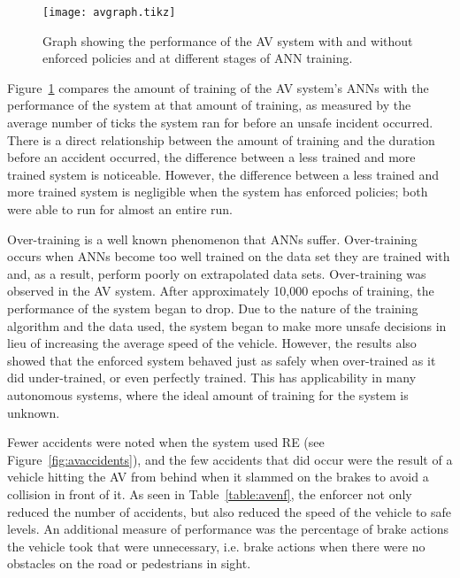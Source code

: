 \begin{figure}[h]
	\centering
	\texttt{[image: avgraph.tikz]}
	\caption{Graph showing the performance of the AV system with and without enforced policies and at different stages of \ac{ANN} training. \label{fig:avtrained}}
\end{figure}

Figure~\ref{fig:avtrained} compares the amount of training of the \ac{AV} system's \acp{ANN} with the performance of the system at that amount of training, as measured by the average number of ticks the system ran for before an unsafe incident occurred.
There is a direct relationship between the amount of training and the duration before an accident occurred, the difference between a less trained and more trained system is noticeable.
However, the difference between a less trained and more trained system is negligible when the system has enforced policies; both were able to run for almost an entire run. 

Over-training is a well known phenomenon that \acp{ANN} suffer. 
Over-training occurs when \acp{ANN} become too well trained on the data set they are trained with and, as a result, perform poorly on extrapolated data sets. 
Over-training was observed in the \ac{AV} system.
After approximately 10,000 epochs of training, the performance of the system began to drop. 
Due to the nature of the training algorithm and the data used, the system began to make more unsafe decisions in lieu of increasing the average speed of the vehicle.
However, the results also showed that the enforced system behaved just as safely when over-trained as it did under-trained, or even perfectly trained. 
This has applicability in many autonomous systems, where the ideal amount of training for the system is unknown. 

Fewer accidents were noted when the system used \ac{RE} (see Figure~\ref{fig:avaccidents}), and the few accidents that did occur were the result of a vehicle hitting the \ac{AV} from behind when it slammed on the brakes to avoid a collision in front of it.
As seen in Table~\ref{table:avenf}, the enforcer not only reduced the number of accidents, but also reduced the speed of the vehicle to safe levels. 
An additional measure of performance was the percentage of brake actions the vehicle took that were unnecessary, i.e. brake actions when there were no obstacles on the road or pedestrians in sight.

